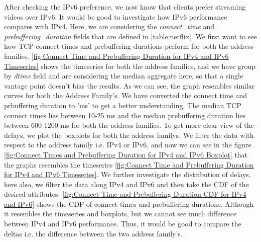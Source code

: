 After checking the IPv6 preference, we now know that clients prefer streaming videos over IPv6. It would be good to investigate how IPv6 performance compares with IPv4. Here,
we are considering the \textit{connect\_time} and \textit{prebuffering\_duration} fields that are defined in \cref{table:netflix}. We first want to see how TCP connect times and prebuffering durations perform for both the address families.
\cref{fig:Connect Time and Prebuffering Duration for IPv4 and IPv6 Timeseries} shows the timeseries for both the address families, and we have group by \textit{dtime} field and are considering the median aggregate here, so that a single vantage point doesn't bias the results.
As we can see, the graph resembles similar curves for both the Address Family’s. We have converted the connect time and prbuffering duration to 'ms' to get a better understanding. The median TCP connect times lies between 10-25 ms and the median prebuffering duration lies between 600-1200 ms for both the address families.
To get more clear view of the delays, we plot the boxplots for both the address familys. We filter the data with respect to the address family i.e. IPv4 or IPv6, and now we can see in the figure \cref{fig:Connect Times and Prebuffering Duration for IPv4 and IPv6 Boxplot} that the graphs resembles the timeseries \cref{fig:Connect Time and Prebuffering Duration for IPv4 and IPv6 Timeseries}.
We further investigate the distribution of delays, here also, we filter the data along IPv4 and IPv6 and then take the CDF of the desired attributes. \cref{fig:Connect Time and Prebuffering Duration CDF for IPv4 and IPv6} shows the CDF of connect times and prebuffering durations. Although it resembles the timeseries and boxplots, but we cannot see
much difference between IPv4 and IPv6 performance. Thus, it would be good to compare the deltas i.e. the difference between the two address family's.

